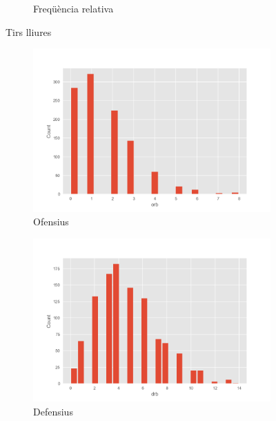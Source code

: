 \documentclass{article}
\begin{document}
\begin{figure}[!h]
\begin{subfigure}[b]{0.25\textwidth}
		\caption*{Freqüència relativa}
		\label{fig:hist15}
	\end{subfigure}
	\caption{Tirs lliures}
	\label{fig:tirs}
\end{figure}
\begin{figure}[!h]
	\centering
	\begin{subfigure}[b]{0.25\textwidth}
		\centering
		\includegraphics[width=\textwidth]{hist16}
		\caption*{Ofensius}
		\label{fig:hist16}
	\end{subfigure}
	\hfill
	\begin{subfigure}[b]{0.25\textwidth}
		\centering
		\includegraphics[width=\textwidth]{hist17}
		\caption*{Defensius}
		\label{fig:hist17}
	\end{subfigure}
	\hfill
	\begin{subfigure}[b]{0.25\textwidth}
		\centering

\end{subfigure}
\end{figure}
\end{document}
